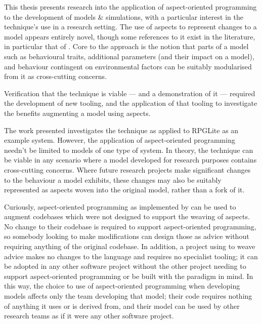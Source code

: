 This thesis presents research into the application of aspect-oriented
programming to the development of models \& simulations, with a particular
interest in the technique's use in a research setting. The use of aspects to
represent changes to a model appears entirely novel, though some references to
it exist in the literature, in particular that of \citet{gulyas1999use}. Core to
the approach is the notion that parts of a model such as behavioural traits,
additional parameters (and their impact on a model), and behaviour contingent on
environmental factors can be suitably modularised from it as cross-cutting
concerns. 

Verification that the technique is viable --- and a demonstration of it ---
required the development of new tooling, and the application of that tooling to
investigate the benefits augmenting a model using aspects.

The work presented investigates the technique as applied to RPGLite as an
example \sociotechnical system. However, the application of aspect-oriented
programming needn't be limited to models of one type of system. In theory, the
technique can be viable in any scenario where a model developed for research
purposes contains cross-cutting concerns. Where future research projects make
significant changes to the behaviour a model exhibits, these changes may also be
suitably represented as aspects woven into the original model, rather than a
fork of it.

Curiously, aspect-oriented programming as implemented by \pdsf can be used to
augment codebases which were not designed to support the weaving of aspects. No
change to their codebase is required to support aspect-oriented programming, so
somebody looking to make modifications can design those as advice without
requiring anything of the original codebase. In addition, a project using \pdsf
to weave advice makes no changes to the language and requires no specialist
tooling; it can be adopted in any other software project without the other
project needing to support aspect-oriented programming or be built with the
paradigm in mind. In this way, the choice to use of aspect-oriented programming
when developing models affects only the team developing that model; their code
requires nothing of anything it uses or is derived from, and their model can
be used by other research teams as if it were any other software
project.






